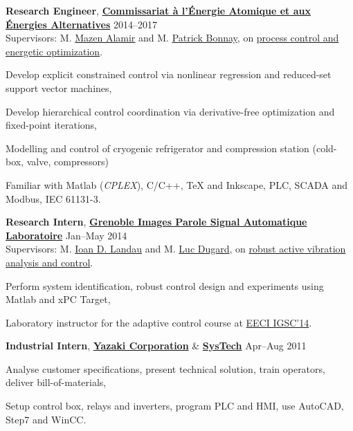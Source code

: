 \documentclass[a4paper,11pt]{article}
\begin{document}
	\vspace{0.1cm}
	
	\textbf{Research Engineer},
	\href{http://www.cea.fr/}{\textbf{Commissariat \`{a} l'\'{E}nergie Atomique et aux \'{E}nergies Alternatives}}
	\hfill {2014--2017}\\
	Supervisors: M. \href{http://www.mazenalamir.fr/home/}{Mazen Alamir} and M. \href{https://www.researchgate.net/profile/P_Bonnay}{Patrick Bonnay}, on \href{https://vuongvtrinh.github.io/project/cryogenic-refrigerator/}{process control and energetic optimization}.
	\begin{innerlist}
		\item Develop explicit constrained control via nonlinear regression and reduced-set support vector machines,
		\item Develop hierarchical control coordination via derivative-free optimization and fixed-point iterations, 
		\item Modelling and control of cryogenic refrigerator and compression station (cold-box, valve, compressors)
		\item Familiar with Matlab (\emph{CPLEX}), C/C++, TeX and Inkscape, PLC, SCADA and Modbus, IEC 61131-3.
	\end{innerlist}
	
	\vspace{0.1cm}
	
	\textbf{Research Intern},
	\href{http://www.gipsa-lab.fr/}{\textbf{Grenoble Images Parole Signal Automatique Laboratoire}}
	\hfill {Jan--May 2014}\\
	Supervisors: M. \href{https://www.gipsa-lab.grenoble-inp.fr/~ioandore.landau/}{Ioan D. Landau} and M. \href{https://www.researchgate.net/profile/Luc_Dugard}{Luc Dugard}, on \href{https://www.gipsa-lab.grenoble-inp.fr/~ioandore.landau/benchmark_adaptive_regulation/}{robust active vibration analysis and control}.
	\begin{innerlist}
		\item Perform system identification, robust control design and experiments using Matlab and xPC Target,
		\item  Laboratory instructor for the adaptive control course at \href{http://www.eeci-igsc.eu/}{EECI IGSC'14}.
	\end{innerlist}
	
	\vspace{0.1cm}
	
	\textbf{Industrial Intern},
	\href{http://www.yhv.com.vn}{\textbf{Yazaki Corporation}} \& \href{https://systech.vn/}{\textbf{SysTech}}
	\hfill {Apr--Aug 2011}
	\begin{innerlist}
		\item Analyse customer specifications, present technical solution, train operators, deliver bill-of-materials,
		\item Setup control box, relays and inverters, program PLC and HMI, use AutoCAD, Step7 and WinCC.
	\end{innerlist}
	
\end{document}
